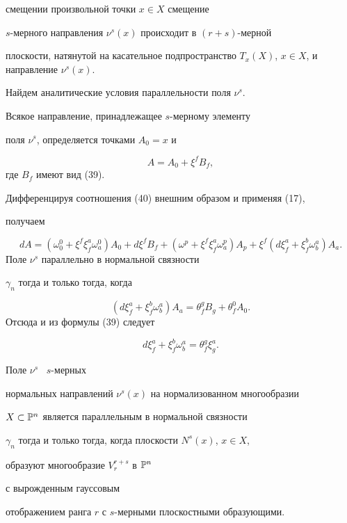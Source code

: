смещении произвольной точки $x \in X$ смещение


$s$-мерного направления $\nu^s (x)$ происходит в $(r + s)$-мерной


плоскости, натянутой на касательное подпространство $T_x


(X)$, $x \in X$, и направление $\nu^s (x)$.





Найдем аналитические условия параллельности поля $\nu^s$.


Всякое направление, принадлежащее $s$-мерному элементу


поля $\nu^s$, определяется точками $A_0 = x$ и


\begin{equation}\label{eq:57}
A = A_0 + \xi^f B_f,
\end{equation}
где $B_f$ имеют вид (39).



Дифференцируя соотношения (40) внешним образом и применяя (17),


получаем


\begin{equation*}


dA = (\omega_0^0 + \xi^f \xi_f^a \omega_a^0) A_0 + d \xi^f B_f +
(\omega^p + \xi^f \xi_f^a \omega_a^p) A_p + \xi^f (d\xi_f^a +
\xi_f^b \omega_b^a) A_a.
\end{equation*}
Поле $\nu^s$ параллельно в нормальной связности


$\gamma_n$ тогда и только тогда, когда


$$
(d\xi_f^a + \xi_f^b \omega_b^a) A_a = \theta_f^g B_g + \theta_f^0
A_0.
$$
Отсюда и из формулы (39) следует


$$


d\xi_f^a + \xi_f^b \omega_b^a = \theta^g_f \xi_g^a.


$$




\begin{thm}


Поле $\nu^s$ \ $s$-мерных


нормальных направлений $\nu^s (x)$ на нормализованном многообразии


$X \subset \Bbb{P}^n$ является параллельным в нормальной связности


$\gamma_n$ тогда и только тогда, когда плоскости $N^s (x)$, $x \in X$,


образуют многообразие $V^{r+s}_{r}$ в $\Bbb{P}^n$


с вырожденным гауссовым


отображением ранга $r$ с $s$-мерными плоскостными образующими.


\end{thm}

